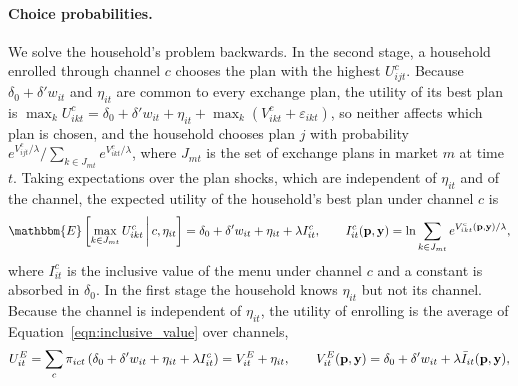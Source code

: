 \documentclass[12pt]{article}
\begin{document}
\paragraph{Choice probabilities.} We solve the household's problem backwards. In the second stage, a household enrolled through channel $c$ chooses the plan with the highest $U^c_{ijt}$. Because $\delta_0 + \delta' w_{it}$ and $\eta_{it}$ are common to every exchange plan, the utility of its best plan is $\max_{k} U^c_{ikt} = \delta_0 + \delta' w_{it} + \eta_{it} + \max_{k} (V^c_{ikt} + \varepsilon_{ikt})$, so neither affects which plan is chosen, and the household chooses plan $j$ with probability $e^{V^c_{ijt}/\lambda} / \sum_{k \in J_{mt}} e^{V^c_{ikt}/\lambda}$, where $J_{mt}$ is the set of exchange plans in market $m$ at time $t$. Taking expectations over the plan shocks, which are independent of $\eta_{it}$ and of the channel, the expected utility of the household's best plan under channel $c$ is
\begin{equation}
\label{eqn:inclusive_value}
	\mathbbm{E}\left[\max_{k \in J_{mt}} U^c_{ikt} \,\middle|\, c, \eta_{it}\right] = \delta_0 + \delta' w_{it} + \eta_{it} + \lambda I^c_{it}, \qquad I^c_{it}({\bf p},{\bf y}) = \ln \sum_{k \in J_{mt}} e^{V^c_{ikt}({\bf p},{\bf y})/\lambda},
\end{equation}
where $I^c_{it}$ is the inclusive value of the menu under channel $c$ and a constant is absorbed in $\delta_0$. In the first stage the household knows $\eta_{it}$ but not its channel. Because the channel is independent of $\eta_{it}$, the utility of enrolling is the average of Equation~\eqref{eqn:inclusive_value} over channels,
\begin{equation*}
	U^E_{it} = \sum_c \pi_{ict} \left(\delta_0 + \delta' w_{it} + \eta_{it} + \lambda I^c_{it}\right) = V^E_{it} + \eta_{it}, \qquad V^E_{it}({\bf p},{\bf y}) = \delta_0 + \delta' w_{it} + \lambda \bar{I}_{it}({\bf p},{\bf y}),
\end{equation*}
\end{document}
